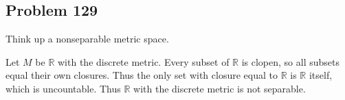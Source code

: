 \documentclass{article}
\newcommand{\R}{\mathbb{R}}
\begin{document}
\subsection*{Problem 129}

Think up a nonseparable metric space.

Let $M$ be $\R$ with the discrete metric. Every subset of $\R$ is clopen, so all subsets equal their own closures. Thus the only set with closure equal to $\R$ is $\R$ itself, which is uncountable. Thus $\R$ with the discrete metric is not separable.
\end{document}
